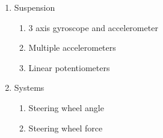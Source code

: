 \begin{enumerate}
\begin{enumerate}
        \item Suspension
        \begin{enumerate}
            \item 3 axis gyroscope and accelerometer
            \item Multiple accelerometers
            \item Linear potentiometers
        \end{enumerate}
        \item Systems
        \begin{enumerate}
            \item Steering wheel angle
            \item Steering wheel force
        \end{enumerate}
    \end{enumerate}
\end{enumerate}

